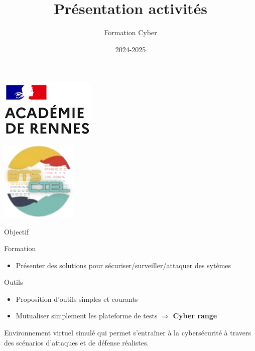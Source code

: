 \documentclass[12pt, handout]{beamer}
\author{Formation Cyber}
\title{Présentation activités}
\institute{\tiny{BTS CIEL}}
\date{2024-2025}%
\newcommand{\titreencadre}{Titre}
\newenvironment{encadre}[1]{\renewcommand{\titreencadre}{#1}
	\begin{mdframed}[style=encadrestyle]
	\vspace{0.5\baselineskip}
	}{%
	\end{mdframed}}
\begin{document}
	

\begin{frame} {}

\begin{minipage}{0.49\linewidth}
\begin{center}
\includegraphics[scale=0.4]{logo_lycee.jpg}\\[\bigskipamount]
\end{center}
\end{minipage}
\begin{minipage}{0.49\linewidth}
\begin{center}
\includegraphics[scale=0.25]{logo_CIEL.png}\\[\bigskipamount]
\end{center}
\end{minipage}


\titlepage
\end{frame}

\begin{frame}{Objectif}
\begin{block}{Formation}
\begin{itemize}
\item Présenter des solutions pour sécuriser/surveiller/attaquer des sytèmes
\end{itemize}
\end{block}

\begin{alertblock}{Outils}
\begin{itemize}
\item Proposition d'outils simples et courants
\item Mutualiser simplement les plateforme de tests $\Rightarrow$ \textbf{Cyber range}
\end{itemize}
\end{alertblock}

\begin{encadre}{Cyber range}
Environnement virtuel simulé qui permet s'entraîner à la cybersécurité à travers des scénarios d’attaques et de défense réalistes.
\end{encadre}
\end{frame}
\end{document}
